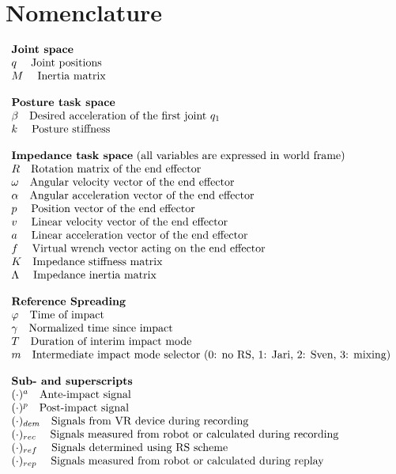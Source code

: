 \documentclass[11pt]{report}
\numberwithin{equation}{section}        %
\numberwithin{figure}{section}          %
\numberwithin{table}{section}           %
\begin{document}
\section*{Nomenclature}

$\begin{array}{l}
\text{\textbf{Joint space}}\\
q \;\quad \text{Joint positions}\\
M \;\quad \text{Inertia matrix}\\
\\
\text{\textbf{Posture task space}}\\
\beta \quad \text{Desired acceleration of the first joint } q_1\\
k \;\quad \text{Posture stiffness}\\

\\
\text{\textbf{Impedance task space} (all variables are expressed in world frame)}\\
R \quad \text{Rotation matrix of the end effector}\\
\omega \quad \text{Angular velocity vector of the end effector}\\
\alpha \quad \text{Angular acceleration vector of the end effector}\\
p \;\quad \text{Position vector of the end effector}\\
v \;\quad \text{Linear velocity vector of the end effector}\\
a \;\quad \text{Linear acceleration vector of the end effector}\\
f \;\quad \text{Virtual wrench vector acting on the end effector}\\
K \quad \text{Impedance stiffness matrix} \\
\Lambda \;\quad \text{Impedance inertia matrix} \\
\\

\text{\textbf{Reference Spreading}}\\
\varphi  \quad \text{Time of impact}\\
\gamma  \quad \text{Normalized time since impact}\\
T  \quad \text{Duration of interim impact mode}\\
m \quad \text{Intermediate impact mode selector (0: no RS, 1: Jari, 2: Sven, 3: mixing)}\\\\
\text{\textbf{Sub- and superscripts}}\\
(\cdot)^{a} \quad \text{Ante-impact signal}\\
(\cdot)^{p} \quad \text{Post-impact signal}\\
(\cdot)_{dem} \quad \text{Signals from VR device during recording}\\
(\cdot)_{rec} \;\quad \text{Signals measured from robot or calculated during recording}\\
(\cdot)_{ref} \;\quad \text{Signals determined using RS scheme}\\
(\cdot)_{rep} \;\quad \text{Signals measured from robot or calculated during replay}\\
\end{array}$
\newpage
\end{document}
